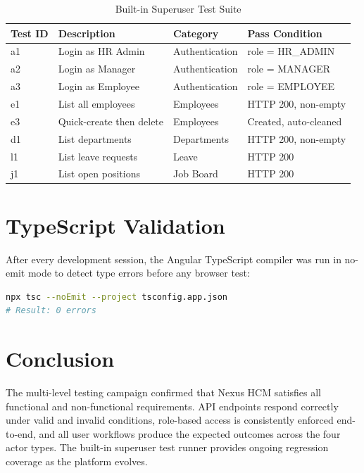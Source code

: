 \documentclass[12pt,a4paper]{report}
\begin{document}
\begin{table}[H]
\centering
\caption{Built-in Superuser Test Suite}
\label{tab:test_suite}
\begin{tabular}{|C{1.8cm}|L{5cm}|C{2.5cm}|C{3cm}|}
\hline
{}
\textbf{Test ID} & \textbf{Description} & \textbf{Category} & \textbf{Pass Condition} \\
\hline
a1 & Login as HR Admin       & Authentication & role = HR\_ADMIN \\
\hline
a2 & Login as Manager        & Authentication & role = MANAGER \\
\hline
a3 & Login as Employee       & Authentication & role = EMPLOYEE \\
\hline
e1 & List all employees      & Employees      & HTTP 200, non-empty \\
\hline
e3 & Quick-create then delete & Employees     & Created, auto-cleaned \\
\hline
d1 & List departments        & Departments    & HTTP 200, non-empty \\
\hline
l1 & List leave requests     & Leave          & HTTP 200 \\
\hline
j1 & List open positions     & Job Board      & HTTP 200 \\
\hline
\end{tabular}
\end{table}

\section{TypeScript Validation}

After every development session, the Angular TypeScript compiler was run in no-emit mode
to detect type errors before any browser test:

\begin{lstlisting}[language=bash, caption={TypeScript Zero-Error Validation}]
npx tsc --noEmit --project tsconfig.app.json
# Result: 0 errors
\end{lstlisting}

\section{Conclusion}

The multi-level testing campaign confirmed that Nexus HCM satisfies all functional and
non-functional requirements. API endpoints respond correctly under valid and invalid
conditions, role-based access is consistently enforced end-to-end, and all user
workflows produce the expected outcomes across the four actor types. The built-in
superuser test runner provides ongoing regression coverage as the platform evolves.
\end{document}
